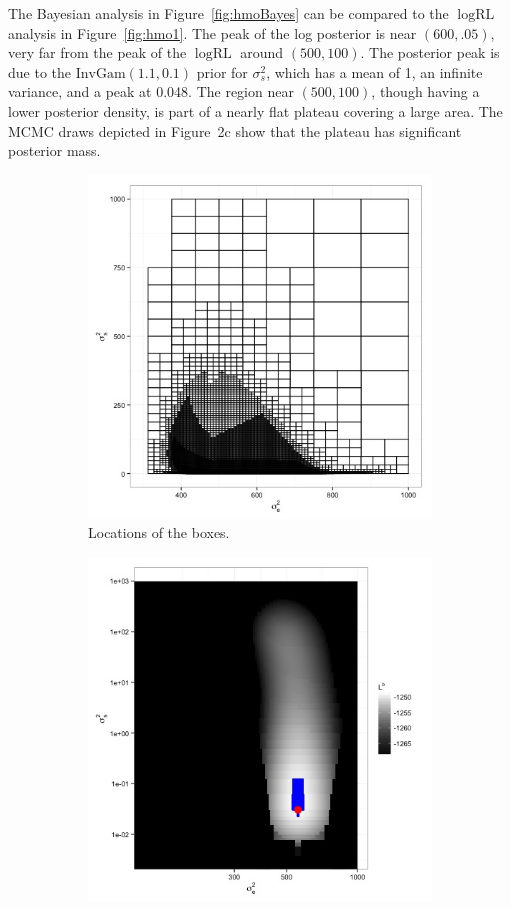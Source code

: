 \documentclass{report}
\newcommand{\IG}{\text{InvGam}}
\newcommand{\RLorig}{\text{RL}}
\newcommand{\logRLorig}{\log\RLorig}
\newcommand{\sigssq}{\sigma_s^2}
\begin{document}
The Bayesian analysis in Figure~\ref{fig:hmoBayes} can be compared to the $\logRLorig$ analysis in Figure~\ref{fig:hmo1}.  The peak of the log posterior is near $(600, .05)$, very far from the peak of the $\logRLorig$ around $(500,100)$.  The posterior peak is due to the $\IG(1.1,0.1)$ prior for $\sigssq$, which has a mean of 1, an infinite variance, and a peak at 0.048.  The region near $(500,100)$, though having a lower posterior density, is part of a nearly flat plateau covering a large area.  The MCMC draws depicted in \cite{henn&hodges:2014} Figure~2c show that the plateau has significant posterior mass.

\begin{figure}
  \begin{subfigure}{.5\textwidth}
	\centering
	\includegraphics[width=.8\linewidth]{figs/hmo_HH11Bayes_boxes.jpg}
	\caption{Locations of the boxes.}
	\label{fig:hmoBayesboxes}
  \end{subfigure}
  \begin{subfigure}{.5\textwidth}
	\centering
	\includegraphics[width=.8\linewidth]{figs/hmo_HH11Bayes_rll.jpg}

\end{subfigure}
\end{figure}
\end{document}
